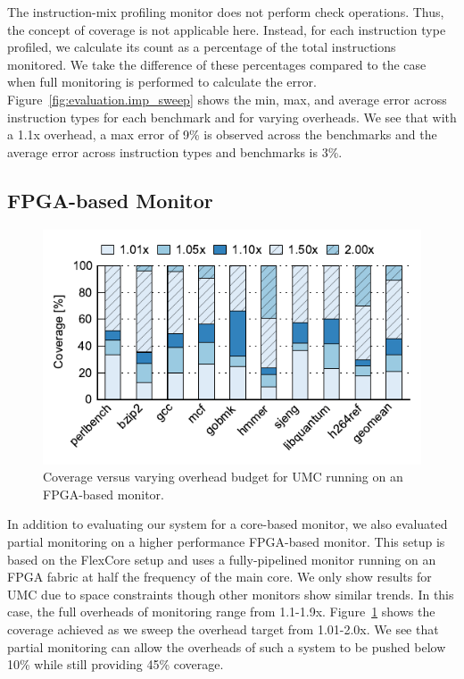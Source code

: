 The instruction-mix profiling monitor does not perform check operations. Thus,
the concept of coverage is not applicable here. Instead, for each instruction
type profiled, we calculate its count as a percentage of the total instructions
monitored. We take the difference of these percentages compared to the case
when full monitoring
is performed to calculate the error. Figure~\ref{fig:evaluation.imp_sweep}
shows the min, max, and average error across
instruction types for each benchmark and for varying overheads. We see that
with a 1.1x overhead, a max error of 9\% is observed across the benchmarks and the
average error across instruction types and benchmarks is 3\%. 

\subsection{FPGA-based Monitor}
\label{sec:evaluation.fpga}

\begin{figure}
  \begin{center}
    \vspace{-0.1in}
    \includegraphics[width=\linewidth]{figs/data_fpga_umc_sweep.pdf}
    \vspace{-0.2in}
    \caption{Coverage versus varying overhead budget for UMC running on an FPGA-based monitor.}
    \label{fig:evaluation.fpga_umc_sweep}
    \vspace{-0.1in}
  \end{center}
\end{figure}

In addition to evaluating our system for a core-based monitor, we also
evaluated partial monitoring on a higher performance FPGA-based monitor. This
setup is based on the FlexCore \cite{flexcore-micro10} setup and uses a
fully-pipelined monitor running on an FPGA fabric at half the frequency of the
main core. We only show results for UMC due to space constraints though other
monitors show similar trends. In this case, the full overheads of
monitoring range from 1.1-1.9x. Figure~\ref{fig:evaluation.fpga_umc_sweep} shows
the coverage achieved as we sweep the overhead target from 1.01-2.0x. We see that partial
monitoring can allow the overheads of such a system to be pushed below 10\%
while still providing 45\% coverage.

